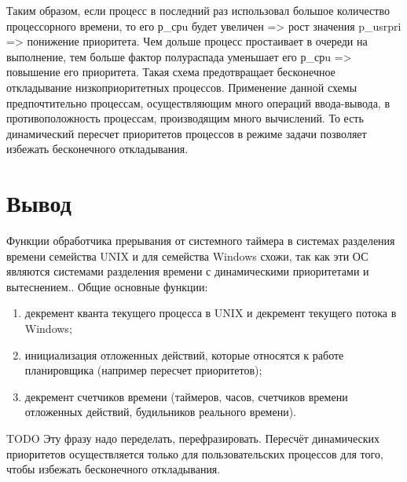 Таким образом, если процесс в последний раз использовал большое количество процессорного времени, то его р\_срu будет увеличен => рост значения p\_usrpri => понижение приоритета.  Чем дольше процесс простаивает в очереди на выполнение, тем больше фактор полураспада уменьшает его р\_срu => повышение его приоритета. Такая схема предотвращает бесконечное откладывание низкоприоритетных процессов. Применение данной схемы предпочтительно процессам, осуществляющим много операций ввода-вывода, в противоположность процессам, производящим много вычислений. То есть динамический пересчет приоритетов процессов в режиме задачи позволяет избежать бесконечного откладывания.


\chapter{Вывод}
Функции обработчика прерывания от системного таймера в системах разделения времени семейства UNIX и для семейства Windows схожи, так как эти ОС являются системами разделения времени с динамическими приоритетами и вытеснением.. Общие основные функции:
\begin{enumerate}[label=\arabic*)]
	\item декремент кванта текущего процесса в UNIX и декремент текущего потока в Windows;
	\item инициализация отложенных действий, которые относятся к работе планировщика (например пересчет приоритетов);
	\item декремент счетчиков времени (таймеров, часов, счетчиков времени отложенных действий, будильников реального времени).
\end{enumerate}

TODO Эту фразу надо переделать, перефразировать.
Пересчёт динамических приоритетов осуществляется только для пользовательских процессов для того, чтобы избежать бесконечного откладывания.

\clearpage


